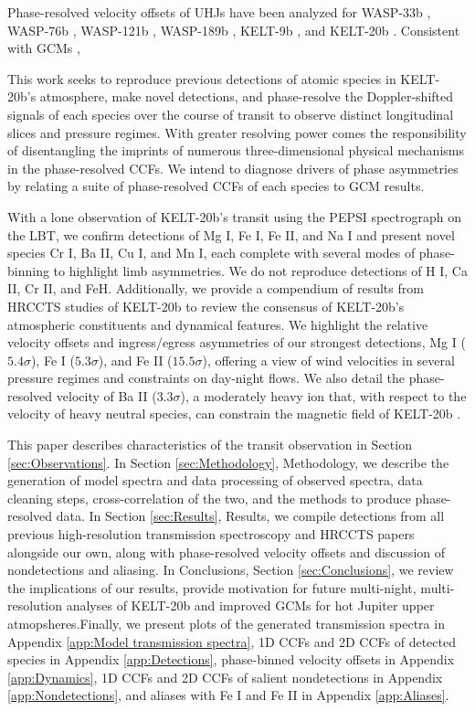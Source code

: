 \documentclass[twocolumn]{aastex631}
\begin{document}
        Phase-resolved velocity offsets of UHJs have been analyzed for WASP-33b \citep{Cauley2021}, WASP-76b \citep{Ehrenreich2020, Kesseli2022}, WASP-121b \citep{Wardenier2024}, WASP-189b \citep{Prinoth2023}, KELT-9b \citep{Cauley2019, Pino2022}, and KELT-20b \citep{Hoeijmakers2020, Rainer2021}. Consistent with GCMs \citep{},  

        This work seeks to reproduce previous detections of atomic species in KELT-20b's atmosphere, make novel detections, and phase-resolve the Doppler-shifted signals of each species over the course of transit to observe distinct longitudinal slices and pressure regimes. With greater resolving power comes the responsibility of disentangling the imprints of numerous three-dimensional physical mechanisms in the phase-resolved CCFs. We intend to diagnose drivers of phase asymmetries by relating a suite of phase-resolved CCFs of each species to GCM results.

        With a lone observation of KELT-20b's transit using the PEPSI spectrograph on the LBT, we confirm detections of Mg I, Fe I, Fe II, and Na I and present novel species Cr I, Ba II, Cu I, and Mn I, each complete with several modes of phase-binning to highlight limb asymmetries. We do not reproduce detections of H I, Ca II, Cr II, and FeH. Additionally, we provide a compendium of results from HRCCTS studies of KELT-20b to review the consensus of KELT-20b's atmospheric constituents and dynamical features. We highlight the relative velocity offsets and ingress/egress asymmetries of our strongest detections, Mg I ($5.4\sigma$), Fe I ($5.3\sigma$), and Fe II ($15.5\sigma$), offering a view of wind velocities in several pressure regimes and constraints on day-night flows. We also detail the phase-resolved velocity of Ba II ($3.3\sigma$), a moderately heavy ion that, with respect to the velocity of heavy neutral species, can constrain the magnetic field of KELT-20b \citep{Savel2024}. 

        This paper describes characteristics of the transit observation in Section \ref{sec:Observations}. In Section \ref{sec:Methodology}, Methodology, we describe the generation of model spectra and data processing of observed spectra, data cleaning steps, cross-correlation of the two, and the methods to produce phase-resolved data. In Section \ref{sec:Results}, Results, we compile detections from all previous high-resolution transmission spectroscopy and HRCCTS papers alongside our own, along with phase-resolved velocity offsets and discussion of nondetections and aliasing. In Conclusions, Section \ref{sec:Conclusions}, we review the implications of our results, provide motivation for future multi-night, multi-resolution analyses of KELT-20b and improved GCMs for hot Jupiter upper atmopsheres.Finally, we present plots of the generated transmission spectra in Appendix \ref{app:Model transmission spectra}, 1D CCFs and 2D CCFs of detected species in Appendix \ref{app:Detections}, phase-binned velocity offsets in Appendix \ref{app:Dynamics}, 1D CCFs and 2D CCFs of salient nondetections in Appendix \ref{app:Nondetections}, and aliases with Fe I and Fe II in Appendix \ref{app:Aliases}.
        
\end{document}
